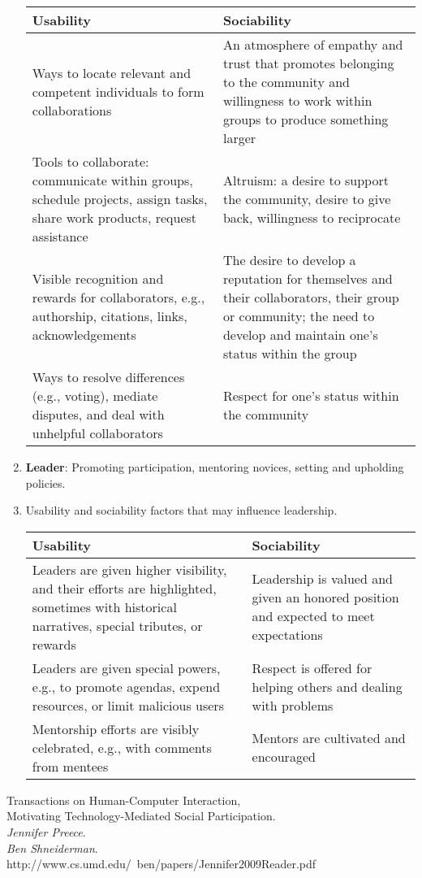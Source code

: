 \documentclass[11pt]{scrartcl}
\begin{document}
\begin{enumerate}
		\begin{tabular}{ | p{6,5cm} | p{} |}
			\hline
			Usability & Sociability\\ \hline
			Ways to locate relevant and competent individuals to form collaborations & An atmosphere of empathy and trust that promotes belonging to the community and willingness to work within groups to produce something larger\\ \hline
			Tools to collaborate: communicate within groups, schedule projects, assign tasks, share work products, request assistance & Altruism: a desire to support the community, desire to give back, willingness to reciprocate\\ \hline
			Visible recognition and rewards for collaborators, e.g., authorship, citations, links, acknowledgements & The desire to develop a reputation for themselves and their collaborators, their group or community; the need to develop and maintain one’s status within the group\\ \hline
			Ways to resolve differences (e.g., voting), mediate disputes, and deal with unhelpful collaborators & Respect for one’s status within the community\\ \hline
		\end{tabular}

		\item \textbf{Leader}: Promoting participation, mentoring novices, setting and upholding policies.
		
		\item Usability and sociability factors that may influence leadership.

		\begin{tabular}{ | p{} | p{} |}
			\hline
			Usability & Sociability\\ \hline
			Leaders are given higher visibility, and their efforts are highlighted, sometimes with historical narratives, special tributes, or rewards & Leadership is valued and given an honored position and expected to meet expectations\\ \hline
			Leaders are given special powers, e.g., to promote agendas, expend resources, or limit malicious users & Respect is offered for helping others and dealing with problems\\ \hline
			Mentorship efforts are visibly celebrated, e.g., with comments from mentees & Mentors are cultivated and encouraged\\ \hline
		\end{tabular}

	\end{enumerate}

\begin{thebibliography}{9}
	
		Transactions on Human-Computer Interaction,\\
		Motivating Technology-Mediated Social Participation.\\
		\emph{Jennifer Preece}.\\
		\emph{Ben Shneiderman}.\\
		http://www.cs.umd.edu/~ben/papers/Jennifer2009Reader.pdf
\end{thebibliography}
\end{document}

